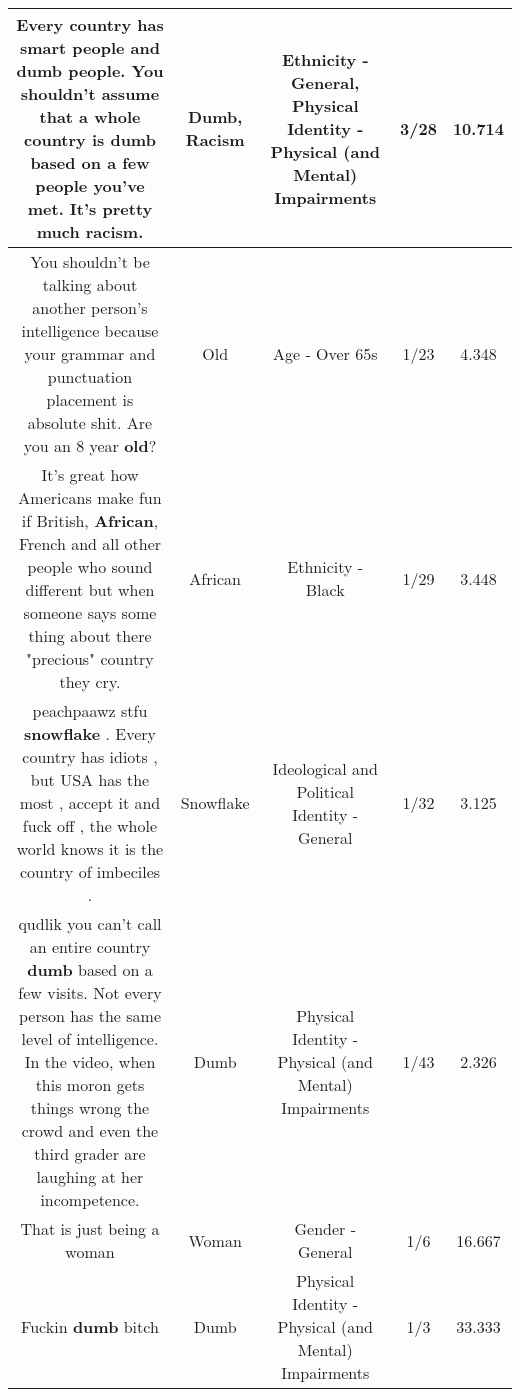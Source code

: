 \documentclass[11pt]{article}
\newlength\mylength
\begin{document}
\begin{center}
\begin{longtable}{|C{.65\mylength}|C{.30\mylength}|C{.12\mylength}|C{.12\mylength}|C{.12\mylength}|}
  \small Every country has smart people and \textbf{dumb} people. You shouldn't assume that a whole country is \textbf{dumb} based on a few people you've met. It's pretty much \textbf{racism}.\normalsize   & Dumb, Racism & Ethnicity - General, Physical Identity - Physical (and Mental) Impairments & 3/28 & 10.714 \\  \hline
  \small You shouldn't be talking about another person's intelligence because your grammar and punctuation placement is absolute shit. Are you an 8 year \textbf{old}?\normalsize   & Old & Age - Over 65s & 1/23 & 4.348 \\  \hline
  \small It's great how Americans make fun if British, \textbf{African}, French and all other people who sound different but when someone says some thing about there "precious" country they cry.\normalsize   & African & Ethnicity - Black & 1/29 & 3.448 \\  \hline
  \small peachpaawz stfu \textbf{snowflake} . Every country has idiots , but USA has the most , accept it and fuck off , the whole world knows it is the country of imbeciles .\normalsize   & Snowflake &  Ideological and Political Identity - General & 1/32 & 3.125 \\  \hline
  \small qudlik you can't call an entire country \textbf{dumb} based on a few visits. Not every person has the same level of intelligence. In the video, when this moron gets things wrong the crowd and even the third grader are laughing at her incompetence.\normalsize   & Dumb & Physical Identity - Physical (and Mental) Impairments & 1/43 & 2.326 \\  \hline
  \small That is just being a woman\normalsize   & Woman & Gender - General & 1/6 & 16.667 \\  \hline
  \small Fuckin \textbf{dumb} bitch\normalsize   & Dumb & Physical Identity - Physical (and Mental) Impairments & 1/3 & 33.333 \\  \hline

\end{longtable}
\end{center}
\end{document}
